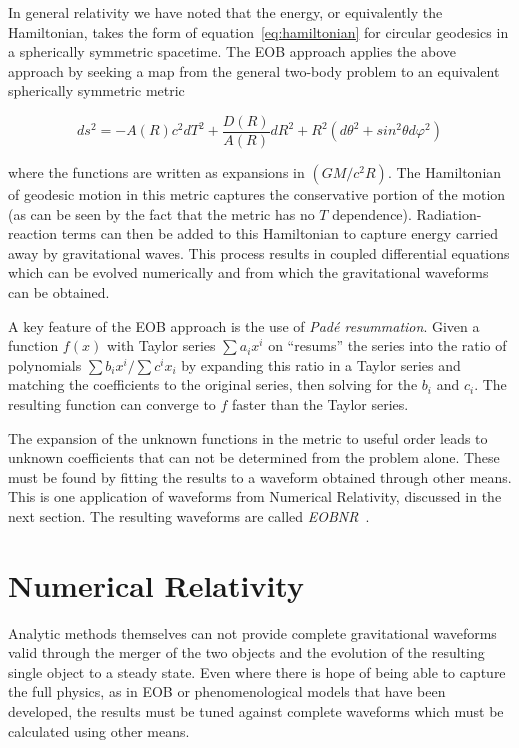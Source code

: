In general relativity we have noted that the energy, or equivalently
the Hamiltonian, takes the form of equation~\ref{eq:hamiltonian} for
circular geodesics in a spherically symmetric spacetime.  The EOB
approach applies the above approach by seeking a map from the general
two-body problem to an equivalent spherically symmetric
metric

\begin{equation}
ds^2 = -A(R) c^2 dT^2 + \frac{D(R)}{A(R)} dR^2 + R^2(d\theta^2 + sin^2 \theta
d\varphi^2)
\end{equation}

where the functions are written as expansions in $(GM/c^2R)$.  The
Hamiltonian of geodesic motion in this metric captures the
conservative portion of the motion (as can be seen by the fact that
the metric has no $T$ dependence).  Radiation-reaction terms can then
be added to this Hamiltonian to capture energy carried away by
gravitational waves.  This process results in coupled differential
equations which can be evolved numerically and from which the
gravitational waveforms can be obtained.

A key feature of the EOB approach is the use of \emph{Pad\'{e}
resummation}.  Given a function $f(x)$ with Taylor series $\sum a_i
x^i$ on ``resums'' the series into the ratio of polynomials $\sum b_i
x^i/\sum c^i x_i$ by expanding this ratio in a Taylor series and
matching the coefficients to the original series, then solving for the
$b_i$ and $c_i$.  The resulting function can converge to $f$ faster
than the Taylor series.

The expansion of the unknown functions in the metric to useful order
leads to unknown coefficients that can not be determined from the
problem alone.  These must be found by fitting the results to a
waveform obtained through other means.  This is one application of
waveforms from Numerical Relativity, discussed in the next section.
The resulting waveforms are called
\emph{EOBNR}~\cite{Buonanno:2009qa}.


\section{Numerical Relativity}
\label{sec:NRWaveforms}

Analytic methods themselves can not provide complete gravitational
waveforms valid through the merger of the two objects and the
evolution of the resulting single object to a steady state.  Even
where there is hope of being able to capture the full physics, as in
EOB or phenomenological models that have been developed, the
results must be tuned against complete waveforms which must be
calculated using other means.

